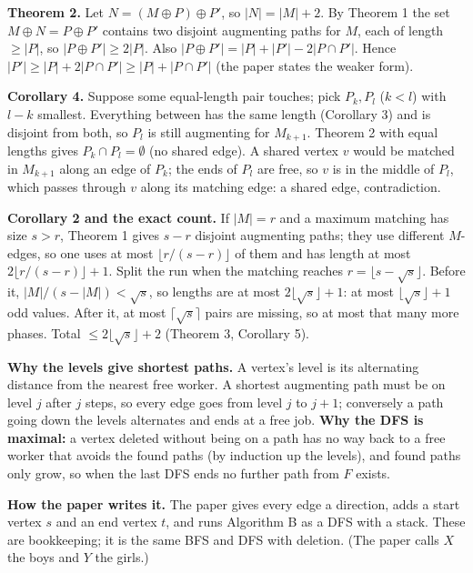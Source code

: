\documentclass[11pt,a4paper]{article}
\begin{document}
\textbf{Theorem 2.} Let $N=(M\oplus P)\oplus P'$, so $|N|=|M|+2$. By Theorem 1 the set $M\oplus N=P\oplus P'$ contains two disjoint augmenting paths for $M$, each of length $\ge|P|$, so $|P\oplus P'|\ge2|P|$. Also $|P\oplus P'|=|P|+|P'|-2|P\cap P'|$. Hence $|P'|\ge|P|+2|P\cap P'|\ge|P|+|P\cap P'|$ (the paper states the weaker form).

\textbf{Corollary 4.} Suppose some equal-length pair touches; pick $P_k,P_l$ ($k<l$) with $l-k$ smallest. Everything between has the same length (Corollary 3) and is disjoint from both, so $P_l$ is still augmenting for $M_{k+1}$. Theorem 2 with equal lengths gives $P_k\cap P_l=\emptyset$ (no shared edge). A shared vertex $v$ would be matched in $M_{k+1}$ along an edge of $P_k$; the ends of $P_l$ are free, so $v$ is in the middle of $P_l$, which passes through $v$ along its matching edge: a shared edge, contradiction.

\textbf{Corollary 2 and the exact count.} If $|M|=r$ and a maximum matching has size $s>r$, Theorem 1 gives $s-r$ disjoint augmenting paths; they use different $M$-edges, so one uses at most $\lfloor r/(s-r)\rfloor$ of them and has length at most $2\lfloor r/(s-r)\rfloor+1$. Split the run when the matching reaches $r=\lfloor s-\sqrt s\rfloor$. Before it, $|M|/(s-|M|)<\sqrt s$, so lengths are at most $2\lfloor\sqrt s\rfloor+1$: at most $\lfloor\sqrt s\rfloor+1$ odd values. After it, at most $\lceil\sqrt s\rceil$ pairs are missing, so at most that many more phases. Total $\le2\lfloor\sqrt s\rfloor+2$ (Theorem 3, Corollary 5).

\textbf{Why the levels give shortest paths.} A vertex's level is its alternating distance from the nearest free worker. A shortest augmenting path must be on level $j$ after $j$ steps, so every edge goes from level $j$ to $j+1$; conversely a path going down the levels alternates and ends at a free job. \textbf{Why the DFS is maximal:} a vertex deleted without being on a path has no way back to a free worker that avoids the found paths (by induction up the levels), and found paths only grow, so when the last DFS ends no further path from $F$ exists.

\textbf{How the paper writes it.} The paper gives every edge a direction, adds a start vertex $s$ and an end vertex $t$, and runs Algorithm B as a DFS with a stack. These are bookkeeping; it is the same BFS and DFS with deletion. (The paper calls $X$ the boys and $Y$ the girls.)
\end{document}
